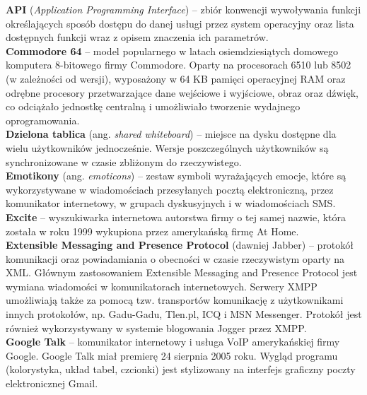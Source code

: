 \documentclass[a4paper,12pt]{article}
\begin{document}
\noindent\textbf{API} (\textit{Application Programming Interface}) -- zbiór konwencji wywoływania funkcji określających sposób dostępu do danej usługi przez system operacyjny oraz lista dostępnych funkcji wraz z opisem znaczenia ich parametrów.\\

\noindent\textbf{Commodore 64} -- model popularnego w latach osiemdziesiątych domowego komputera 8-bitowego firmy Commodore. Oparty na procesorach 6510 lub 8502 (w zależności od wersji), wyposażony w 64 KB pamięci operacyjnej RAM oraz odrębne procesory przetwarzające dane wejściowe i wyjściowe, obraz oraz dźwięk, co odciążało jednostkę centralną i umożliwiało tworzenie wydajnego oprogramowania.\\

\noindent\textbf{Dzielona tablica} (ang. \textit{shared whiteboard}) -- miejsce na dysku dostępne dla wielu użytkowników jednocześnie. Wersje poszczególnych użytkowników są synchronizowane w czasie zbliżonym do rzeczywistego.\\

\noindent\textbf{Emotikony} (ang. \textit{emoticons}) -- zestaw symboli wyrażających emocje, które są wykorzystywane w wiadomościach przesyłanych pocztą elektroniczną, przez komunikator internetowy, w grupach dyskusyjnych i w wiadomościach SMS.\\

\noindent\textbf{Excite} -- wyszukiwarka internetowa autorstwa firmy o tej samej nazwie, która została w roku 1999 wykupiona przez amerykańską firmę At Home.\\

\noindent\textbf{Extensible Messaging and Presence Protocol} (dawniej Jabber) -- protokół komunikacji oraz powiadamiania o obecności w czasie rzeczywistym oparty na XML. Głównym zastosowaniem Extensible Messaging and Presence Protocol jest wymiana wiadomości w komunikatorach internetowych. Serwery XMPP umożliwiają także za pomocą tzw. transportów komunikację z użytkownikami innych protokołów, np. Gadu-Gadu, Tlen.pl, ICQ i MSN Messenger.
Protokół jest również wykorzystywany w systemie blogowania Jogger przez XMPP.\\

\noindent\textbf{Google Talk} -- komunikator internetowy i usługa VoIP amerykańskiej firmy Google. Google Talk miał premierę 24 sierpnia 2005 roku. Wygląd programu (kolorystyka, układ tabel, czcionki) jest stylizowany na interfejs graficzny poczty elektronicznej Gmail.\\
\end{document}
